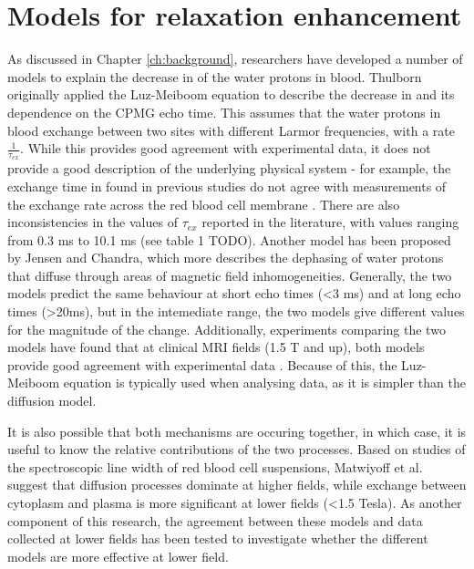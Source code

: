 \chapter{Models for \Ttwo relaxation enhancement}\label{ch:models}

As discussed in Chapter \ref{ch:background}, researchers have developed a number of models to explain the decrease in \Ttwo of the water protons in blood.
Thulborn originally applied the Luz-Meiboom equation to describe the decrease in \Ttwo and its dependence on the CPMG echo time\cite{ThulbornOxygenationdependencetransverse1982}.
This assumes that the water protons in blood exchange between two sites with different Larmor frequencies, with a rate $\frac{1}{\tau_{ex}}$.
While this provides good agreement with experimental data, it does not provide a good description of the underlying physical system - for example, the exchange time in found in previous studies do not agree with measurements of the exchange rate across the red blood cell membrane \cite{MeyerNMRrelaxationrates1995}.
There are also inconsistencies in the values of $\tau_{ex}$ reported in the literature, with values ranging from 0.3 ms to 10.1 ms (see table 1 TODO).
Another model has been proposed by Jensen and Chandra, which more describes the dephasing of water protons that diffuse through areas of magnetic field inhomogeneities\cite{JensenNMRrelaxationtissues2000}.
Generally, the two models predict the same behaviour at short echo times (\textless 3 ms) and at long echo times (\textgreater 20ms)\cite{BrooksT2shorteningweaklymagnetized2001}, but in the intemediate range, the two models give different values for the magnitude of the \Ttwo change.
Additionally, experiments comparing the two models have found that at clinical MRI fields (1.5 T and up), both models provide good agreement with experimental data \cite{StefanovicHumanwholebloodrelaxometry2004,GardenerDependencebloodR22010,GrgacHematocritoxygenationdependence2013}.
Because of this, the Luz-Meiboom equation is typically used when analysing data, as it is simpler than the diffusion model.

It is also possible that both mechanisms are occuring together, in which case, it is useful to know the relative contributions of the two processes.
Based on studies of the spectroscopic line width of red blood cell suspensions, Matwiyoff et al. suggest that diffusion processes dominate at higher fields, while exchange between cytoplasm and plasma is more significant at lower fields (\textless 1.5 Tesla)\cite{Matwiyofflineshapeswater1990}.
As another component of this research, the agreement between these models and data collected at lower fields has been tested to investigate whether the different models are more effective at lower field.

